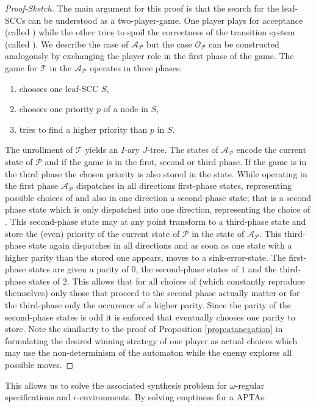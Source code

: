 \begin{proof}[Proof-Sketch]
  The main argument for this proof is that the search for the leaf-\acp{SCC} 
  can be understood as a two-player-game. One player plays for acceptance 
  (called \acceptor{}) while the other tries to spoil the correctness of the 
  transition system (called \spoiler{}). We describe the case of 
  $\mathcal{A}_{\mathcal{P}}$ but the case $\mathcal{O}_{\mathcal{P}}$ can be 
  constructed analogously by exchanging the player role in the first phase of 
  the game. The game for $\mathcal{T}$ in the $\mathcal{A}_{\mathcal{P}}$ 
  operates in three phases:
  \begin{enumerate}
    \item \spoiler{} chooses one leaf-\ac{SCC} $S$,
    \item \acceptor{} chooses one priority $p$ of a node in $S$,
    \item \spoiler{} tries to find a higher priority than $p$ in $S$.
  \end{enumerate}
  The unrollment of $\mathcal{T}$ yields an $I$-ary $J$-tree. The states of 
  $\mathcal{A}_{\mathcal{P}}$ encode the current state of $\mathcal{P}$ and if
  the game is in the first, second or third phase. If the game is in the third
  phase the chosen priority is also stored in the state. While operating in the
  first phase $\mathcal{A}_{\mathcal{P}}$ dispatches in all directions 
  first-phase states, representing possible choices of \spoiler{} and also in
  one direction a second-phase state; that is a second phase state which is 
  only dispatched into one direction, representing the choice of
  \acceptor{}. This second-phase state may at any point transform to a 
  third-phase state and store the (even) priority of the current 
  state of $\mathcal{P}$ in the state of $\mathcal{A}_{\mathcal{P}}$. This 
  third-phase state again dispatches in all directions and as soon as one state 
  with a higher parity than the stored one appears, moves to a 
  sink-error-state. The first-phase states are given a parity of $0$, the 
  second-phase states of $1$ and the third-phase states of $2$. This allows 
  that for all choices of \spoiler{} (which constantly reproduce themselves) 
  only those that proceed to the second phase actually matter or for the 
  third-phase only the occurence of a higher parity. Since the parity of the 
  second-phase states is odd it is enforced that \acceptor{} eventually chooses 
  one parity to store. Note the similarity to the proof of Proposition
  \ref{prop:atanegation} in formulating the desired winning strategy of one 
  player as actual choices which may use the non-determinism of the automaton 
  while the enemy explores all possible moves. 
\end{proof}
This allows us to solve the associated synthesis problem for $\omega$-regular
specifications and $\epsilon$-environments. By solving emptiness for a 
\acp{APTA}.

